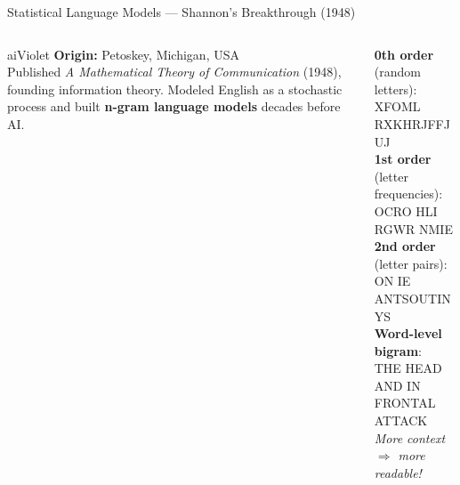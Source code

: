 \begin{frame}[shrink=10]{Statistical Language Models --- Shannon's Breakthrough (1948)}

  \begin{columns}[T]
    \begin{column}{0.45\textwidth}
      \begin{personbox}{aiViolet}
        \textbf{Origin:} Petoskey, Michigan, USA\\[3pt]
        Published \emph{A Mathematical Theory of Communication} (1948),
        founding information theory. Modeled English as a stochastic
        process and built \textbf{n-gram language models} decades before
        AI.
      \end{personbox}

      \vspace{0.3em}
    \end{column}

    \begin{column}{0.52\textwidth}
      \begin{tcolorbox}[colback=gray!5, colframe=gray!50,
        fonttitle=\bfseries\small,
        title={Shannon's Approximations to English},
        rounded corners, boxrule=0.5pt, left=3pt, right=3pt, top=2pt, bottom=2pt]
        \scriptsize
        \textbf{0th order} (random letters):\\
        {\ttfamily XFOML RXKHRJFFJUJ}\\[2pt]
        \textbf{1st order} (letter frequencies):\\
        {\ttfamily OCRO HLI RGWR NMIE}\\[2pt]
        \textbf{2nd order} (letter pairs):\\
        {\ttfamily ON IE ANTSOUTINYS}\\[2pt]
        \textbf{Word-level bigram}:\\
        {\ttfamily THE HEAD AND IN FRONTAL ATTACK}\\[3pt]
        \textit{More context \(\Rightarrow\) more readable!}
      \end{tcolorbox}


\end{column}
\end{columns}
\end{frame}
